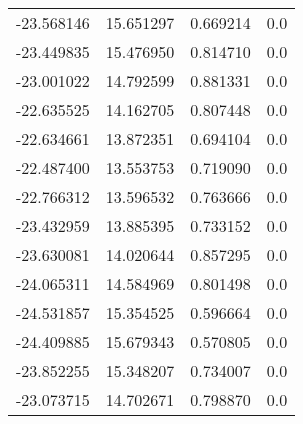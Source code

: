 \begin{tabular}{rrrr}
      -23.568146 &        15.651297 &    0.669214 &   0.0 \\
      -23.449835 &        15.476950 &    0.814710 &   0.0 \\
      -23.001022 &        14.792599 &    0.881331 &   0.0 \\
      -22.635525 &        14.162705 &    0.807448 &   0.0 \\
      -22.634661 &        13.872351 &    0.694104 &   0.0 \\
      -22.487400 &        13.553753 &    0.719090 &   0.0 \\
      -22.766312 &        13.596532 &    0.763666 &   0.0 \\
      -23.432959 &        13.885395 &    0.733152 &   0.0 \\
      -23.630081 &        14.020644 &    0.857295 &   0.0 \\
      -24.065311 &        14.584969 &    0.801498 &   0.0 \\
      -24.531857 &        15.354525 &    0.596664 &   0.0 \\
      -24.409885 &        15.679343 &    0.570805 &   0.0 \\
      -23.852255 &        15.348207 &    0.734007 &   0.0 \\
      -23.073715 &        14.702671 &    0.798870 &   0.0 \\
\bottomrule
\end{tabular}
